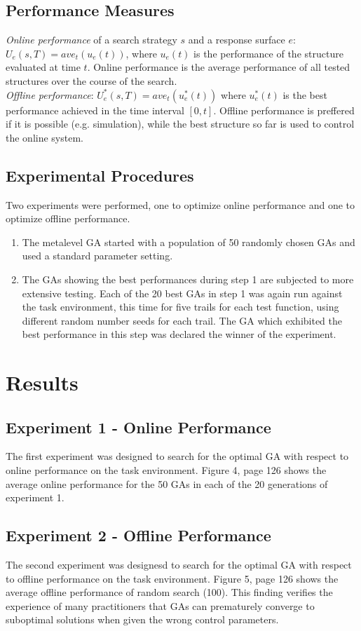 \documentclass[12pt]{book}
\begin{document}
\subsection{Performance Measures}
\textit{Online performance} of a search strategy $s$ and a response surface $e$: $U_e(s,T) = ave_t(u_e(t))$, where $u_e(t)$ is the performance of the structure evaluated at time $t$. Online performance is the average performance of all tested structures over the course of the search.\\
\textit{Offline performance}: $U_e^*(s,T) = ave_t(u_e^*(t))$ where $u_e^*(t)$ is the best performance achieved in the time interval $[0,t]$. Offline performance is preffered if it is possible (e.g. simulation), while the best structure so far is used to control the online system.

\subsection{Experimental Procedures}
Two experiments were performed, one to optimize online performance and one to optimize offline performance.
\begin{enumerate}
\item The metalevel GA started with a population of 50 randomly chosen GAs and used a standard parameter setting.
\item The GAs showing the best performances during step 1 are subjected to more extensive testing. Each of the 20 best GAs in step 1 was again run against the task environment, this time for five trails for each test function, using different random number seeds for each trail. The GA which exhibited the best performance in this step was declared the winner of the experiment.
\end{enumerate}

\section{Results}
\subsection{Experiment 1 - Online Performance}
The first experiment was designed to search for the optimal GA with respect to online performance on the task environment. Figure 4, page 126 shows the average online performance for the 50 GAs in each of the 20 generations of experiment 1.

\subsection{Experiment 2 - Offline Performance}
The second experiment was designesd to search for the optimal GA with respect to offline performance on the task environment. Figure 5, page 126 shows the average offline performance of random search (100). This finding verifies the experience of many practitioners that GAs can prematurely converge to suboptimal solutions when given the wrong control parameters.
\end{document}

